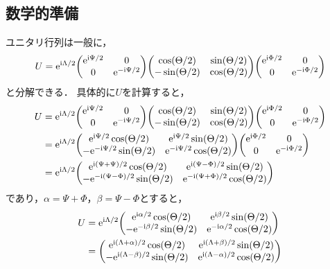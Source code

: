 \documentclass{report}
\begin{document}
  \subsection{数学的準備}\label{unitary-transform}
    ユニタリ行列は一般に，
    \begin{align}
      U = \e^{\i\Lambda/2}
      \mqty(
        \e^{\i\Psi/2} & 0 \\ 
        0 & \e^{-\i\Psi/2}
      )
      \mqty(
        \cos(\Theta/2) & \sin(\Theta/2) \\ 
        -\sin(\Theta/2) & \cos(\Theta/2)
      )\mqty(
        \e^{\i\Phi/2} & 0 \\ 
        0 & \e^{-\i\Phi/2}
      )
    \end{align}
    と分解できる．
    具体的に$U$を計算すると，
    \begin{align}
      U &= \e^{\i\Lambda/2}
      \mqty(
        \e^{\i\Psi/2} & 0 \\ 
        0 & \e^{-\i\Psi/2}
      )
      \mqty(
        \cos(\Theta/2) & \sin(\Theta/2) \\ 
        -\sin(\Theta/2) & \cos(\Theta/2)
      )\mqty(
        \e^{\i\Phi/2} & 0 \\ 
        0 & \e^{-\i\Phi/2}
      ) \\ 
      &= \e^{\i\Lambda/2}\mqty(
        \e^{\i\Psi/2}\cos(\Theta/2) & \e^{\i\Psi/2}\sin(\Theta/2) \\ 
        -\e^{-\i\Psi/2}\sin(\Theta/2) & \e^{-\i\Psi/2}\cos(\Theta/2)
      )\mqty(
        \e^{\i\Phi/2} & 0 \\ 
        0 & \e^{-\i\Phi/2}
      ) \\ 
      &= \e^{\i\Lambda/2}\mqty(
        \e^{\i(\Psi + \Psi) / 2}\cos(\Theta/2) & \e^{\i(\Psi - \Phi) / 2}\sin(\Theta/2) \\ 
        -\e^{-\i(\Psi - \Phi) / 2}\sin(\Theta/2) & \e^{-\i(\Psi + \Phi) / 2}\cos(\Theta/2)
      )\label{unitary-representation}
    \end{align}
    であり，$\alpha = \Psi + \Phi$，$\beta = \Psi - \Phi$とすると，
    \begin{align}
      U &= \e^{\i\Lambda/2}\mqty(
        \e^{\i\alpha / 2}\cos(\Theta/2) & \e^{\i\beta / 2}\sin(\Theta/2) \\ 
        -\e^{-\i\beta / 2}\sin(\Theta/2) & \e^{-\i\alpha / 2}\cos(\Theta/2)
      ) \\ 
      &= \mqty(
        \e^{\i(\Lambda + \alpha) / 2}\cos(\Theta/2) & \e^{\i(\Lambda + \beta) / 2}\sin(\Theta/2) \\ 
        -\e^{\i(\Lambda - \beta) / 2}\sin(\Theta/2) & \e^{\i(\Lambda - \alpha) / 2}\cos(\Theta/2)
      ) 
    \end{align}
\end{document}
